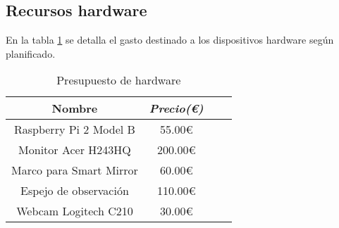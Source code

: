 \subsection{Recursos hardware}

En la tabla \ref{tab:budget-hardware} se detalla el gasto destinado a los dispositivos hardware según planificado.

\begin{table}[htp]
	\centering
	\caption{Presupuesto de hardware}\label{tab:budget-hardware}
	\begin{tabular}{cccc}
		\toprule
    	\textbf{Nombre} & \emph{Precio(\euro)}\\
    	\midrule
		Raspberry Pi 2 Model B	&	55.00€\\
		Monitor Acer H243HQ		&	200.00€\\
		Marco para Smart Mirror	&	60.00€\\
		Espejo de observación	&	110.00€\\
		Webcam Logitech C210	& 	30.00€\\
    	\bottomrule
    \end{tabular}
\end{table}